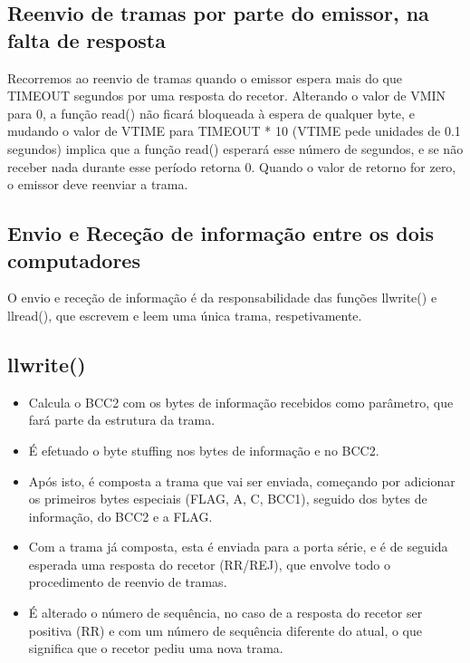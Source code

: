 \documentclass[article, a4paper, 11pt, oneside]{memoir}
\begin{document}
\subsection{Reenvio de tramas por parte do emissor, na falta de resposta}
Recorremos ao reenvio de tramas quando o emissor espera mais do que 
TIMEOUT segundos por uma resposta do recetor. 
Alterando o valor de VMIN para 0, a função read() não ficará bloqueada à espera de 
qualquer byte, e mudando o valor de VTIME para TIMEOUT * 10 (VTIME pede unidades de 0.1 segundos) 
implica que a função read() esperará esse número de segundos, e se não receber nada durante 
esse período retorna 0. Quando o valor de retorno for zero, o emissor deve reenviar a trama.

\subsection{Envio e Receção de informação entre os dois computadores}
O envio e receção de informação é da responsabilidade das funções llwrite() e llread(), 
que escrevem e leem uma única trama, respetivamente. 

\subsection{llwrite()}
\begin{itemize}
	\item Calcula o BCC2 com os bytes de informação recebidos como parâmetro, que fará parte da estrutura da trama.
	\item É efetuado o byte stuffing nos bytes de informação e no BCC2.
	\item Após isto, é composta a trama que vai ser enviada, começando por adicionar os primeiros bytes especiais (FLAG, A, C, BCC1), seguido dos bytes de informação, do BCC2 e a FLAG.
	\item Com a trama já composta, esta é enviada para a porta série, e é de seguida esperada uma resposta do recetor (RR/REJ), que envolve todo o procedimento de reenvio de tramas.
	\item É alterado o número de sequência, no caso de a resposta do recetor ser positiva (RR) e com um número de sequência diferente do atual, o que significa que o recetor pediu uma nova trama.
\end{itemize}
\end{document}
